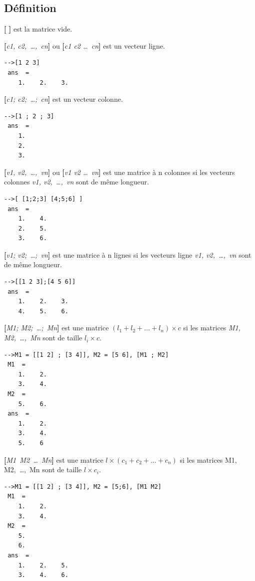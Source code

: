 \documentclass{article}
\begin{document}
\begin{multicols}{3}
\subsection{Définition}
\label{vecteurs}
\begin{description}
\item{\textbf{[ ]}} est la matrice vide.
\item{\textbf{[}\textit{c1, c2,~\ldots ,~cn}\textbf{]} ou \textbf{[}\textit{c1 c2 \ldots ~cn}\textbf{]}} est un vecteur ligne.
\begin{verbatim}
-->[1 2 3]  
 ans  =
    1.    2.    3. 
\end{verbatim}
\item{\textbf{[}\textit{c1; c2;~\ldots ;~cn}\textbf{]}} est un vecteur colonne.
\begin{verbatim}
-->[1 ; 2 ; 3]  
 ans  =
    1.
    2.
    3. 
\end{verbatim}
\item{\textbf{[}\textit{v1, v2,~\ldots ,~vn}\textbf{]} ou \textbf{[}\textit{v1 v2 \ldots ~vn}\textbf{]}} est une matrice à n colonnes si les vecteurs colonnes \textit{v1, v2,~\ldots ,~vn} sont de même longueur.
\begin{verbatim}
-->[ [1;2;3] [4;5;6] ]
 ans  = 
    1.    4.  
    2.    5.  
    3.    6.
\end{verbatim}   
\item{\textbf{[}\textit{v1; v2;~\ldots ;~vn}\textbf{]}} est une matrice à n lignes si les vecteurs ligne \textit{v1, v2,~\ldots ,~vn} sont de même longueur.
\begin{verbatim}
-->[[1 2 3];[4 5 6]]  
 ans  =
    1.    2.    3.  
    4.    5.    6.  
\end{verbatim}
\item{\textbf{[}\textit{M1; M2;~\ldots ;~Mn}\textbf{]}} est une matrice $(l_{1}+l_{2}+\ldots+l_{n}) \times c$ si les matrices \textit{M1, M2,~\ldots ,~Mn} sont de taille $l_{i} \times c$.
\begin{verbatim}
-->M1 = [[1 2] ; [3 4]], M2 = [5 6], [M1 ; M2]
 M1  =
    1.    2.  
    3.    4.  
 M2  = 
    5.    6.  
 ans  =
    1.    2.  
    3.    4.  
    5.    6  
\end{verbatim}
\item{\textbf{[}\textit{M1~M2~\ldots ~Mn}\textbf{]}} est une matrice $l \times (c_{1}+c_{2}+\ldots+c_{n})$ si les matrices M1, M2,~\ldots ,~Mn sont de taille $l \times c_{i}$.
\begin{verbatim}
-->M1 = [[1 2] ; [3 4]], M2 = [5;6], [M1 M2]
 M1  =
    1.    2.  
    3.    4.  
 M2  =
    5.  
    6.  
 ans  =
    1.    2.    5.  
    3.    4.    6.  
\end{verbatim}
\end{description}

\end{multicols}
\end{document}
